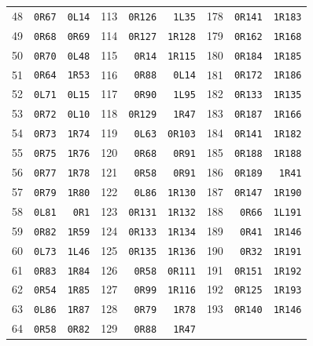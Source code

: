 {\begin{longtable}{@{}rrr@{\hspace{18pt}}rrr@{\hspace{18pt}}rrr@{}}
48 & \texttt{0R67} & \texttt{0L14} & 113 & \texttt{0R126} & \texttt{1L35} & 178 & \texttt{0R141} & \texttt{1R183}\\
49 & \texttt{0R68} & \texttt{0R69} & 114 & \texttt{0R127} & \texttt{1R128} & 179 & \texttt{0R162} & \texttt{1R168}\\
50 & \texttt{0R70} & \texttt{0L48} & 115 & \texttt{0R14} & \texttt{1R115} & 180 & \texttt{0R184} & \texttt{1R185}\\
51 & \texttt{0R64} & \texttt{1R53} & 116 & \texttt{0R88} & \texttt{0L14} & 181 & \texttt{0R172} & \texttt{1R186}\\
52 & \texttt{0L71} & \texttt{0L15} & 117 & \texttt{0R90} & \texttt{1L95} & 182 & \texttt{0R133} & \texttt{1R135}\\
53 & \texttt{0R72} & \texttt{0L10} & 118 & \texttt{0R129} & \texttt{1R47} & 183 & \texttt{0R187} & \texttt{1R166}\\
54 & \texttt{0R73} & \texttt{1R74} & 119 & \texttt{0L63} & \texttt{0R103} & 184 & \texttt{0R141} & \texttt{1R182}\\
55 & \texttt{0R75} & \texttt{1R76} & 120 & \texttt{0R68} & \texttt{0R91} & 185 & \texttt{0R188} & \texttt{1R188}\\
56 & \texttt{0R77} & \texttt{1R78} & 121 & \texttt{0R58} & \texttt{0R91} & 186 & \texttt{0R189} & \texttt{1R41}\\
57 & \texttt{0R79} & \texttt{1R80} & 122 & \texttt{0L86} & \texttt{1R130} & 187 & \texttt{0R147} & \texttt{1R190}\\
58 & \texttt{0L81} & \texttt{0R1} & 123 & \texttt{0R131} & \texttt{1R132} & 188 & \texttt{0R66} & \texttt{1L191}\\
59 & \texttt{0R82} & \texttt{1R59} & 124 & \texttt{0R133} & \texttt{1R134} & 189 & \texttt{0R41} & \texttt{1R146}\\
60 & \texttt{0L73} & \texttt{1L46} & 125 & \texttt{0R135} & \texttt{1R136} & 190 & \texttt{0R32} & \texttt{1R191}\\
61 & \texttt{0R83} & \texttt{1R84} & 126 & \texttt{0R58} & \texttt{0R111} & 191 & \texttt{0R151} & \texttt{1R192}\\
62 & \texttt{0R54} & \texttt{1R85} & 127 & \texttt{0R99} & \texttt{1R116} & 192 & \texttt{0R125} & \texttt{1R193}\\
63 & \texttt{0L86} & \texttt{1R87} & 128 & \texttt{0R79} & \texttt{1R78} & 193 & \texttt{0R140} & \texttt{1R146}\\
64 & \texttt{0R58} & \texttt{0R82} & 129 & \texttt{0R88} & \texttt{1R47} &  & & \\
\bottomrule\end{longtable}}
